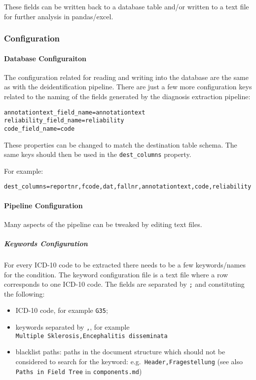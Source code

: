 These fields can be written back to a database table and/or written to a
text file for further analysis in pandas/excel.

\subsubsection{Configuration}\label{structuring-configuration}

\paragraph{Database Configuraiton}\label{database-configuraiton}

The configuration related for reading and writing into the database are
the same as with the deidentification pipeline. There are just a few
more configuration keys related to the naming of the fields generated by
the diagnosis extraction pipeline:

\begin{verbatim}
annotationtext_field_name=annotationtext
reliability_field_name=reliability
code_field_name=code
\end{verbatim}

These properties can be changed to match the destination table schema.
The same keys should then be used in the \texttt{dest\_columns}
property.

For example:

\begin{verbatim}
dest_columns=reportnr,fcode,dat,fallnr,annotationtext,code,reliability
\end{verbatim}

\paragraph{Pipeline Configuration}\label{pipeline-structuring-configuration}

Many aspects of the pipeline can be tweaked by editing text files.

\subparagraph{Keywords Configuration}\label{keywords-configuration}

For every ICD-10 code to be extracted there needs to be a few
keywords/names for the condition. The keyword configuration file is a
text file where a row corresponds to one ICD-10 code. The fields are
separated by \texttt{;} and constituting the following:

\begin{itemize}
\tightlist
\item
  ICD-10 code, for example \texttt{G35};
\item
  keywords separated by \texttt{,}, for example
  \texttt{Multiple\ Sklerosis,Encephalitis\ disseminata}
\item
  blacklist paths: paths in the document structure which should not be
  considered to search for the keyword:
  e.g.~\texttt{Header,Fragestellung} (see also
  \texttt{Paths\ in\ Field\ Tree} in \texttt{components.md})
\end{itemize}

